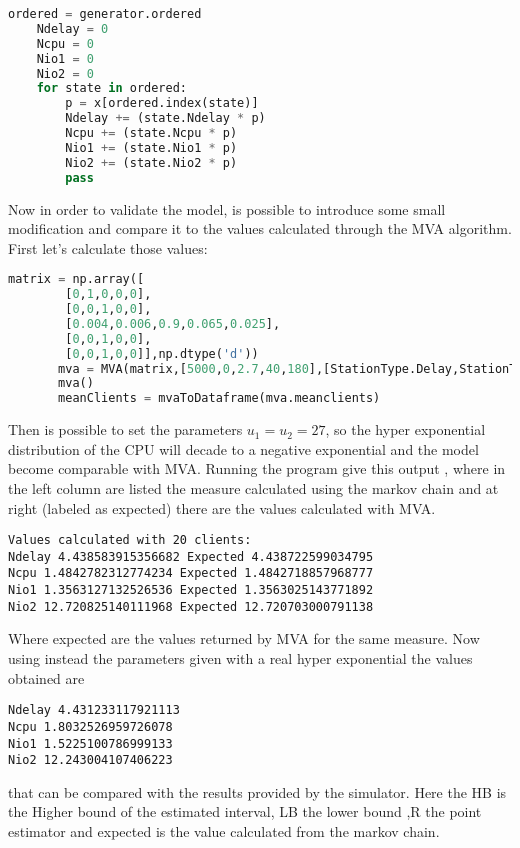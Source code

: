 \documentclass[12pt,a4paper]{article}
\begin{document}
\begin{lstlisting}[language=python]
    ordered = generator.ordered
    Ndelay = 0
    Ncpu = 0
    Nio1 = 0
    Nio2 = 0
    for state in ordered:
        p = x[ordered.index(state)]
        Ndelay += (state.Ndelay * p)
        Ncpu += (state.Ncpu * p)
        Nio1 += (state.Nio1 * p)
        Nio2 += (state.Nio2 * p)
        pass
\end{lstlisting}

Now in order to validate the model, is possible to introduce some small modification and compare it to the values calculated through the MVA algorithm. First let's calculate those values:
\begin{lstlisting}[language=python]
    matrix = np.array([
        [0,1,0,0,0],
        [0,0,1,0,0],
        [0.004,0.006,0.9,0.065,0.025],
        [0,0,1,0,0],
        [0,0,1,0,0]],np.dtype('d'))
       mva = MVA(matrix,[5000,0,2.7,40,180],[StationType.Delay,StationType.LoadIndependent,StationType.LoadIndependent,StationType.LoadIndependent,StationType.LoadIndependent],30)
       mva()
       meanClients = mvaToDataframe(mva.meanclients)
\end{lstlisting}
\pagebreak
Then is possible to set the parameters $u_1=u_2=27$, so the hyper exponential distribution of the CPU will decade to a negative exponential and the model become comparable with MVA. Running the program give this output , where in the left column are listed the measure calculated using the markov chain and at right (labeled as expected) there are the values calculated with MVA. 

\begin{verbatim}
Values calculated with 20 clients:
Ndelay 4.438583915356682 Expected 4.438722599034795
Ncpu 1.4842782312774234 Expected 1.4842718857968777
Nio1 1.3563127132526536 Expected 1.3563025143771892
Nio2 12.720825140111968 Expected 12.720703000791138
\end{verbatim}

Where expected are the values returned by MVA for the same measure. Now using instead the parameters given with a real hyper exponential the values obtained are 

\begin{verbatim}
Ndelay 4.431233117921113
Ncpu 1.8032526959726078 
Nio1 1.5225100786999133 
Nio2 12.243004107406223 
\end{verbatim}

that can be compared with the results provided by the simulator. Here the HB is the Higher bound of the estimated interval, LB the lower bound ,R the point estimator and expected is the value calculated from the markov chain.
\end{document}
